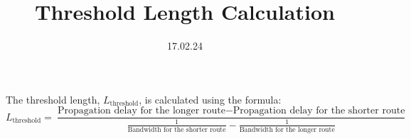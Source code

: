 \documentclass{article}
\begin{document}
\title{Threshold Length Calculation}
\author{}
\date{17.02.24}

\maketitle

The threshold length, \( L_{\text{threshold}} \), is calculated using the formula:
\begin{equation}
L_{\text{threshold}} = \frac{\text{Propagation delay for the longer route} - \text{Propagation delay for the shorter route}}{\frac{1}{\text{Bandwidth for the shorter route}} - \frac{1}{\text{Bandwidth for the longer route}}}
\end{equation}
\end{document}
